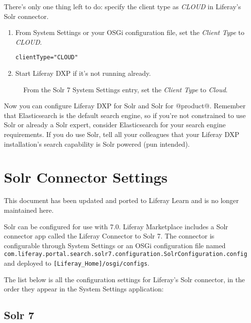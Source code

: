 There's only one thing left to do: specify the client type as
\emph{CLOUD} in Liferay's Solr connector.

\begin{enumerate}
\def\labelenumi{\arabic{enumi}.}
\item
  From System Settings or your OSGi configuration file, set the
  \emph{Client Type} to \emph{CLOUD}.

\begin{verbatim}
clientType="CLOUD"
\end{verbatim}
\item
  Start Liferay DXP if it's not running already.
\end{enumerate}

\begin{figure}
\centering
{}
\caption{From the Solr 7 System Settings entry, set the \emph{Client
Type} to \emph{Cloud}.}
\end{figure}

Now you can configure Liferay DXP for Solr and Solr for @product@.
Remember that Elasticsearch is the default search engine, so if you're
not constrained to use Solr or already a Solr expert, consider
Elasticsearch for your search engine requirements. If you do use Solr,
tell all your colleagues that your Liferay DXP installation's search
capability is Solr powered (pun intended).

\chapter{Solr Connector Settings}\label{solr-connector-settings}

{This document has been updated and ported to Liferay Learn and is no
longer maintained here.}

Solr can be configured for use with 7.0. Liferay Marketplace includes a
Solr connector app called the Liferay Connector to Solr 7. The connector
is configurable through System Settings or an OSGi configuration file
named
\texttt{com.liferay.portal.search.solr7.configuration.SolrConfiguration.config}
and deployed to \texttt{{[}Liferay\_Home{]}/osgi/configs}.

The list below is all the configuration settings for Liferay's Solr
connector, in the order they appear in the System Settings application:

\section{Solr 7}\label{solr-7}

